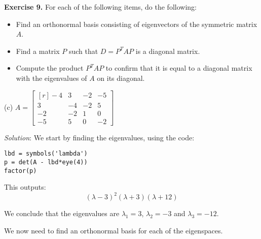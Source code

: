 \documentclass[12pt]{article}
\begin{document}
\bigskip
\textbf{Exercise 9.} For each of the following items, do the following:
\begin{itemize}
\item Find an orthonormal basis consisting of eigenvectors of the symmetric matrix $A$.
\item Find a matrix $P$ such that $D=P^TAP$ is a diagonal matrix.
\item Compute the product $P^TAP$ to confirm that it is equal to a diagonal matrix with the eigenvalues of $A$ on its diagonal.
\end{itemize}

\medskip
\medskip
(c)
$A=\left[\begin{matrix*}[r]-4 & 3 & -2 & -5\\3 & -4 & -2 & 5\\-2 & -2 & 1 & 0\\-5 & 5 & 0 & -2\end{matrix*}\right]$

\emph{Solution}: We start by finding the eigenvalues, using the code:
\begin{lstlisting}
lbd = symbols('lambda')
p = det(A - lbd*eye(4))
factor(p)
\end{lstlisting}
This outputs:
\[
\left(\lambda - 3\right)^{2} \left(\lambda + 3\right) \left(\lambda + 12\right)
\]

We conclude that the eigenvalues are $\lambda_1=3$, $\lambda_2=-3$ and $\lambda_3=-12$.

We now need to find an orthonormal basis for each of the eigenspaces.
\end{document}

